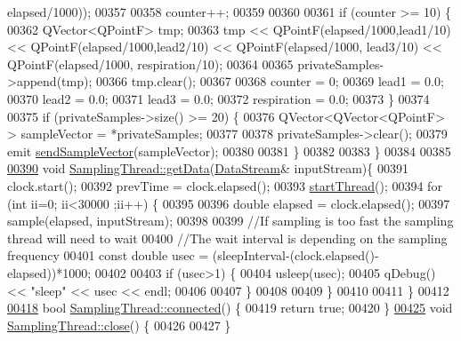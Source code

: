 \begin{DoxyCode}
      elapsed/1000));
00357 
00358     counter++;
00359 
00360 
00361     \textcolor{keywordflow}{if} (counter >= 10) \{
00362         QVector<QPointF> tmp;
00363         tmp << QPointF(elapsed/1000,lead1/10) << QPointF(elapsed/1000,lead2/10) << QPointF(elapsed/1000,
      lead3/10) << QPointF(elapsed/1000, respiration/10);
00364 
00365         privateSamples->append(tmp);
00366         tmp.clear();
00367 
00368         counter = 0;
00369         lead1 = 0.0;
00370         lead2 = 0.0;
00371         lead3 = 0.0;
00372         respiration = 0.0;
00373     \}
00374 
00375     \textcolor{keywordflow}{if} (privateSamples->size() >= 20) \{
00376         QVector<QVector<QPointF> > sampleVector = *privateSamples;
00377 
00378         privateSamples->clear();
00379         emit \hyperlink{classDeviceInterface_ae1bcd766865161a659076d2561e79dc5}{sendSampleVector}(sampleVector);
00380 
00381     \}
00382 
00383 \}
00384 
00385 
\hypertarget{samplingthread_8cpp_source.tex_l00390}{}\hyperlink{classSamplingThread_aa52f1e7171ae5cb8432e949635b02d25}{00390} \textcolor{keywordtype}{void} \hyperlink{classSamplingThread_aa52f1e7171ae5cb8432e949635b02d25}{SamplingThread::getData}(\hyperlink{classDataStream}{DataStream}& inputStream)\{
00391     clock.start();
00392     prevTime = clock.elapsed();
00393     \hyperlink{classSamplingThread_ab1284bf5429771100bf0a60ffe3aacef}{startThread}();
00394     \textcolor{keywordflow}{for} (\textcolor{keywordtype}{int} ii=0; ii<30000 ;ii++) \{
00395 
00396         \textcolor{keywordtype}{double} elapsed = clock.elapsed();
00397         sample(elapsed, inputStream);
00398 
00399         \textcolor{comment}{//If sampling is too fast the sampling thread will need to wait}
00400         \textcolor{comment}{//The wait interval is depending on the sampling frequency}
00401         \textcolor{keyword}{const} \textcolor{keywordtype}{double} usec = (sleepInterval-(clock.elapsed()-elapsed))*1000;
00402 
00403         \textcolor{keywordflow}{if} (usec>1) \{
00404             usleep(usec);
00405             qDebug() << \textcolor{stringliteral}{"sleep"} << usec  << endl;
00406 
00407         \}
00408 
00409     \}
00410 
00411 \}
00412 
\hypertarget{samplingthread_8cpp_source.tex_l00418}{}\hyperlink{classSamplingThread_a0770f5d1d0c0160cf023fae294010961}{00418} \textcolor{keywordtype}{bool} \hyperlink{classSamplingThread_a0770f5d1d0c0160cf023fae294010961}{SamplingThread::connected}() \{
00419     \textcolor{keywordflow}{return} \textcolor{keyword}{true};
00420 \}
\hypertarget{samplingthread_8cpp_source.tex_l00425}{}\hyperlink{classSamplingThread_aade561b442e580b0ca4af112de2d7a41}{00425} \textcolor{keywordtype}{void} \hyperlink{classSamplingThread_aade561b442e580b0ca4af112de2d7a41}{SamplingThread::close}() \{
00426 
00427 \}
\end{DoxyCode}
